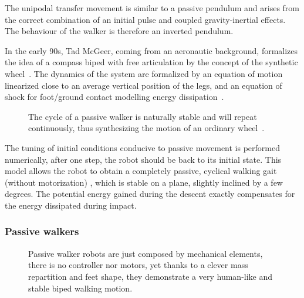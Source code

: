 The unipodal transfer movement is similar to a passive pendulum and arises from the correct combination of an initial pulse and coupled gravity-inertial effects. The behaviour of the walker is therefore an inverted pendulum.

In the early 90s, Tad McGeer, coming from an aeronautic background, formalizes the idea of a compass biped with free articulation by the concept of the synthetic wheel~\parencite{mcgeer1990passive}.
The dynamics of the system are formalized by an equation of motion linearized close to an average vertical position of the legs, and an equation of shock for foot/ground contact modelling energy dissipation~\parencite{mcgeer1992principles}.

\begin{figure}[tb]
\centering
    \hfil
    \caption{The cycle of a passive walker is naturally stable and will repeat continuously, thus synthesizing the motion of an ordinary wheel~\parencite{mcgeer1992principles}.}
    \label{fig:synthetic-wheel}
\end{figure}


The tuning of initial conditions conducive to passive movement is performed numerically, after one step, the robot should be back to its initial state. This model allows the robot to obtain a completely passive, cyclical walking gait (without motorization) , which is stable on a plane, slightly inclined by a few degrees. The potential energy gained during the descent exactly compensates for the energy dissipated during impact.


\subsubsection{Passive walkers} %

\begin{figure}[tb]
\centering
    \hfil
    \caption{Passive walker robots are just composed by mechanical elements, there is no controller nor motors, yet thanks to a clever mass repartition and feet shape, they demonstrate a very human-like and stable biped walking motion.}
    \label{fig:mcgeer_work}
\end{figure}

